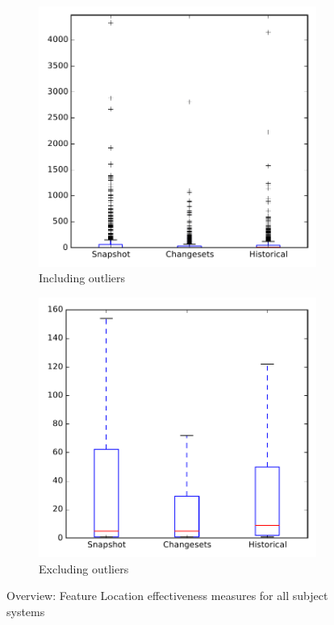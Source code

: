 
\begin{figure}
    \centering
    \begin{subfigure}{.4\textwidth}
        \centering
        \includegraphics[height=0.4\textheight]{figures/flt/all_overview}
        \caption{Including outliers}\label{fig:flt:all:overview_outlier}
    \end{subfigure}%
    \begin{subfigure}{.4\textwidth}
        \centering
        \includegraphics[height=0.4\textheight]{figures/flt/all_overview_no_outlier}
        \caption{Excluding outliers}\label{fig:flt:all:overview_no_outlier}
    \end{subfigure}
\caption{Overview: Feature Location effectiveness measures for all subject systems}
\label{fig:flt:all:overview}
\end{figure}

